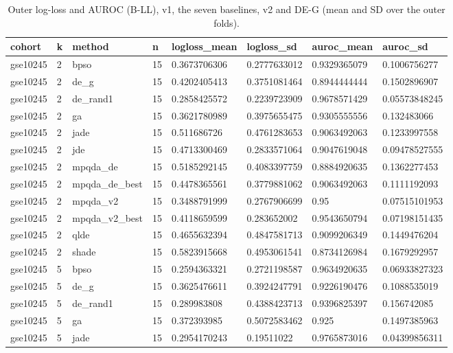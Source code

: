 \begin{table}[t]
\centering
\caption{Outer log-loss and AUROC (B-LL), v1, the seven baselines, v2 and DE-G (mean and SD over the outer folds).}\label{tab:table_v2_main}
\begin{tabular}{llllllll}
\hline
cohort & k & method & n & logloss\_mean & logloss\_sd & auroc\_mean & auroc\_sd \\
\hline
gse10245 & 2 & bpso & 15 & 0.3673706306 & 0.2777633012 & 0.9329365079 & 0.1006756277 \\
gse10245 & 2 & de\_g & 15 & 0.4202405413 & 0.3751081464 & 0.8944444444 & 0.1502896907 \\
gse10245 & 2 & de\_rand1 & 15 & 0.2858425572 & 0.2239723909 & 0.9678571429 & 0.05573848245 \\
gse10245 & 2 & ga & 15 & 0.3621780989 & 0.3975655475 & 0.9305555556 & 0.132483066 \\
gse10245 & 2 & jade & 15 & 0.511686726 & 0.4761283653 & 0.9063492063 & 0.1233997558 \\
gse10245 & 2 & jde & 15 & 0.4713300469 & 0.2833571064 & 0.9047619048 & 0.09478527555 \\
gse10245 & 2 & mpqda\_de & 15 & 0.5185292145 & 0.4083397759 & 0.8884920635 & 0.1362277453 \\
gse10245 & 2 & mpqda\_de\_best & 15 & 0.4478365561 & 0.3779881062 & 0.9063492063 & 0.1111192093 \\
gse10245 & 2 & mpqda\_v2 & 15 & 0.3488791999 & 0.2767906699 & 0.95 & 0.07515101953 \\
gse10245 & 2 & mpqda\_v2\_best & 15 & 0.4118659599 & 0.283652002 & 0.9543650794 & 0.07198151435 \\
gse10245 & 2 & qlde & 15 & 0.4655632394 & 0.4847581713 & 0.9099206349 & 0.1449476204 \\
gse10245 & 2 & shade & 15 & 0.5823915668 & 0.4953061541 & 0.8734126984 & 0.1679292957 \\
gse10245 & 5 & bpso & 15 & 0.2594363321 & 0.2721198587 & 0.9634920635 & 0.06933827323 \\
gse10245 & 5 & de\_g & 15 & 0.3625476611 & 0.3924247791 & 0.9226190476 & 0.1088535019 \\
gse10245 & 5 & de\_rand1 & 15 & 0.289983808 & 0.4388423713 & 0.9396825397 & 0.156742085 \\
gse10245 & 5 & ga & 15 & 0.372393985 & 0.5072583462 & 0.925 & 0.1497385963 \\
gse10245 & 5 & jade & 15 & 0.2954170243 & 0.19511022 & 0.9765873016 & 0.04399856311 \\

\end{tabular}
\end{table}
